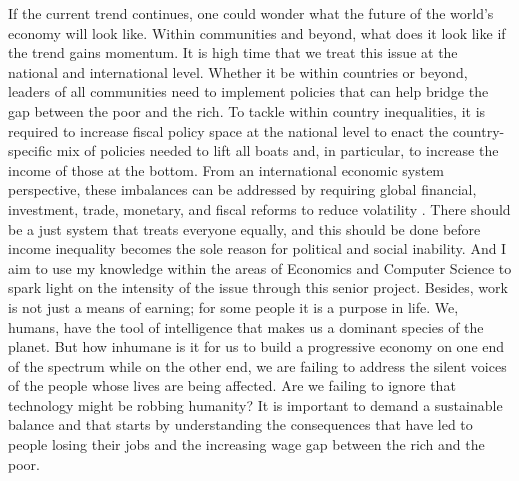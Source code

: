 If the current trend continues, one could wonder what the future of the world's economy will look like. Within communities and beyond, what does it look like if the trend gains momentum. It is high time that we treat this issue at the national and international level. Whether it be within countries or beyond, leaders of all communities need to implement policies that can help bridge the gap between the poor and the rich. To tackle within country inequalities, it is required to increase fiscal policy space at the national level to enact the country-specific mix of policies needed to lift all boats and, in particular, to increase the income of those at the bottom. From an international economic system perspective, these imbalances can be addressed by requiring global financial, investment, trade, monetary, and fiscal reforms to reduce volatility \cite{carpentier_wright_passos}. There should be a just system that treats everyone equally, and this should be done before income inequality becomes the sole reason for political and social inability. And I aim to use my knowledge within the areas of Economics and Computer Science to spark light on the intensity of the issue through this senior project. Besides, work is not just a means of earning; for some people it is a purpose in life. We, humans, have the tool of intelligence that makes us a dominant species of the planet. But how inhumane is it for us to build a progressive economy on one end of the spectrum while on the other end,
we are failing to address the silent voices of the people whose lives are being affected. Are we failing to ignore that technology might be robbing humanity? It is important to demand a sustainable balance and that starts by understanding the consequences that have led to people losing their jobs and the increasing wage gap between the rich and the poor.

